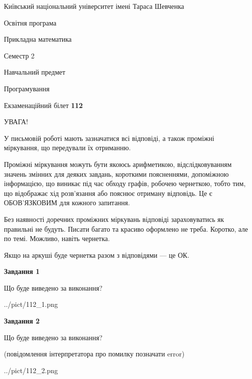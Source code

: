\documentclass[12pt, ukrainian]{article}
\begin{document}
{{\begin {small}\par
{ \center  Київський національний університет імені Тараса Шевченка \par}
{\parbox {5 cm}{Освітня програма \hfill}{\parbox {7 cm}{Прикладна математика\hfill}}\parbox {6 cm}{\hfill Семестр 2}}\par
{\parbox {5 cm} {Навчальний предмет \hfill}\parbox {7 cm}{Програмування \hfill}\parbox {6cm}{\hfill}\par}\vspace{-7pt} \end{small}}{\center Екзаменаційний білет \No \textbf
{ 112 }\par}}
{
\begin {large}
УВАГА!

У письмовій роботі мають зазначатися всі відповіді, а також проміжні міркування, що передували їх отриманню.

Проміжні міркування можуть бути якоюсь арифметикою, відслідковуванням зна\-чень змінних для деяких завдань,
короткими поясненнями, допоміжною інформацією, що виникає під час обходу графів, робочею чернеткою,
тобто тим, що відображає хід розв’язання або пояснює отриману відповідь.
Це є ОБОВ’ЯЗКОВИМ для кожного запитання.

Без наявності доречних проміжних міркувань відповіді зараховуватись як правиль\-ні не будуть.
Писати багато та красиво оформлено не треба. Коротко, але по темі. Можли\-во, навіть чернетка.

Якщо на аркуші буде чернетка разом з відповідями --- це ОК.

\newpage

{\begin {center}\textbf{Завдання 1}\end {center}}\par
Що буде виведено за виконання?\par
\begin{center}
	{../pict/112_1.png}
\end{center}
\newpage

{\begin {center}\textbf{Завдання 2}\end {center}}\par
Що буде виведено за виконання?\par
 (повідомлення інтерпретатора про помилку позначати error)\par
\begin{center}
	{../pict/112_2.png}
\end{center}
\newpage


\end{large}}
\end{document}
